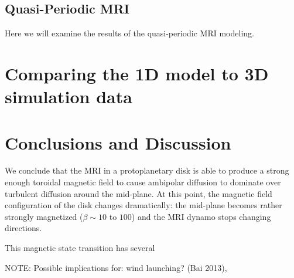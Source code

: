 

\subsection{Quasi-Periodic MRI}
Here we will examine the results of the quasi-periodic MRI modeling.  






\newpage
\section{Comparing the 1D model to 3D simulation data}





\newpage
\section{Conclusions and Discussion}
We conclude that the MRI in a protoplanetary disk is able to produce a strong enough toroidal magnetic field to cause ambipolar diffusion to dominate over turbulent diffusion around the mid-plane.  At this point, the magnetic field configuration of the disk changes dramatically: the mid-plane becomes rather strongly magnetized ($\beta \sim 10$ to $100$) and the MRI dynamo stops changing directions.

This magnetic state transition has several 

NOTE: Possible implications for: wind launching? (Bai 2013), 





